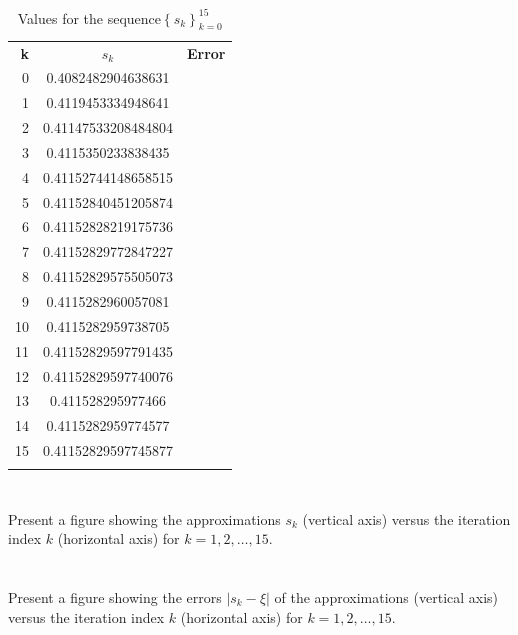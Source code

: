 \documentclass{article}
\begin{document}
\begin{table}[H]
    \centering
    \begin{tabular}{|r|c|c|}
        \Xhline{1 pt}
         \centering \textbf{k}& \textbf{$s_k$}& \textbf{Error}  \\
         \Xhline{1.5 pt}
         0 & 0.4082482904638631&\\
         \Xhline{1 pt}
         1 & 0.4119453334948641&\\
         \Xhline{1 pt}
         2 & 0.41147533208484804&\\
         \Xhline{1 pt}
         3 & 0.4115350233838435&\\
         \Xhline{1 pt}
         4 & 0.41152744148658515 &\\
         \Xhline{1 pt}
         5 & 0.41152840451205874 & \\
          \Xhline{1 pt}
         6 & 0.41152828219175736 & \\
          \Xhline{1 pt}
         7 & 0.41152829772847227 &\\
          \Xhline{1 pt}
         8 & 0.41152829575505073 &\\
          \Xhline{1 pt}
         9 & 0.4115282960057081 &\\
          \Xhline{1 pt}
         10 & 0.4115282959738705 &\\
          \Xhline{1 pt}
         11 & 0.41152829597791435 &\\
          \Xhline{1 pt}
         12 & 0.41152829597740076 &\\
          \Xhline{1 pt}
         13 & 0.411528295977466 &\\
          \Xhline{1 pt}
         14 & 0.4115282959774577&\\
          \Xhline{1 pt}
         15 & 0.41152829597745877&\\
         \Xhline{1 pt}
    \end{tabular}
    \caption{Values for the sequence$\left\{ s_k\right\}_{k=0}^{15}$}
    \label{tab:15sequence}
\end{table}

\section{}
Present a figure showing the approximations $s_k$ (vertical axis) versus the iteration index $k$ (horizontal axis) for $k=1,2,\dots,15$.
\vspace{10mm}

\section{}
Present a figure showing the errors $|s_k - \xi|$ of the approximations (vertical axis) versus the iteration index $k$ (horizontal axis) for $k=1,2,\dots,15$.
\vspace{10mm}
\end{document}
